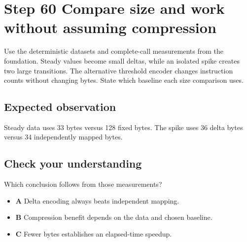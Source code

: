 \section{Step 60 Compare size and work without assuming compression}\label{delta-s60}

Use the deterministic datasets and complete-call measurements from the foundation. Steady values become small deltas, while an isolated spike creates two large transitions. The alternative threshold encoder changes instruction counts without changing bytes. State which baseline each size comparison uses.

\subsection{Expected observation}
Steady data uses 33 bytes versus 128 fixed bytes. The spike uses 36 delta bytes versus 34 independently mapped bytes.

\subsection{Check your understanding}
Which conclusion follows from those measurements?

\begin{itemize}
\item \textbf{A} Delta encoding always beats independent mapping.
\item \textbf{B} Compression benefit depends on the data and chosen baseline.
\item \textbf{C} Fewer bytes establishes an elapsed-time speedup.
\end{itemize}
